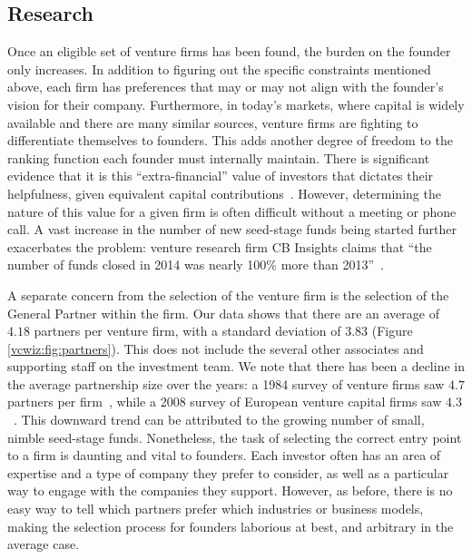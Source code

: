 \subsection{Research}
\label{ch3:motivation:research}

Once an eligible set of venture firms has been found, the burden on the founder only increases. In addition to figuring out the specific constraints mentioned above, each firm has preferences that may or may not align with the founder's vision for their company. Furthermore, in today's markets, where capital is widely available and there are many similar sources, venture firms are fighting to differentiate themselves to founders. This adds another degree of freedom to the ranking function each founder must internally maintain. There is significant evidence that it is this ``extra-financial'' value of investors that dictates their helpfulness, given equivalent capital contributions~\cite{doi:10.1111/j.1540-6261.2004.00680.x}. However, determining the nature of this value for a given firm is often difficult without a meeting or phone call. A vast increase in the number of new seed-stage funds being started further exacerbates the problem: venture research firm CB Insights claims that ``the number of funds closed in 2014 was nearly 100\% more than 2013''~\cite{cbinsights-research-barbell}.

A separate concern from the selection of the venture firm is the selection of the General Partner within the firm. Our data shows that there are an average of $4.18$ partners per venture firm, with a standard deviation of $3.83$ (Figure \ref{vcwiz:fig:partners}). This does not include the several other associates and supporting staff on the investment team. We note that there has been a decline in the average partnership size over the years: a 1984 survey of venture firms saw $4.7$ partners per firm~\cite{GORMAN1989231}, while a 2008 survey of European venture capital firms saw $4.3$~\cite{BOTTAZZI2008488}. This downward trend can be attributed to the growing number of small, nimble seed-stage funds. Nonetheless, the task of selecting the correct entry point to a firm is daunting and vital to founders. Each investor often has an area of expertise and a type of company they prefer to consider, as well as a particular way to engage with the companies they support. However, as before, there is no easy way to tell which partners prefer which industries or business models, making the selection process for founders laborious at best, and arbitrary in the average case.

